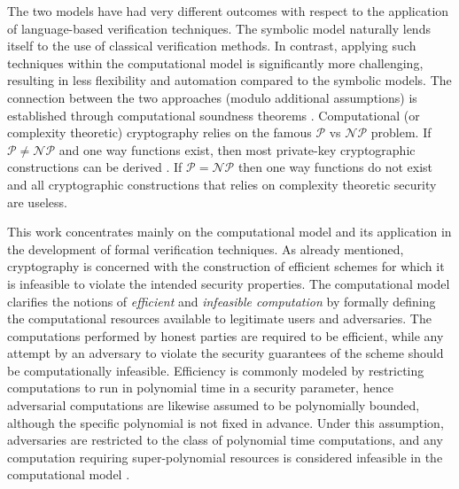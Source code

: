 The two models have had very different outcomes with respect to the application of language-based verification techniques. The symbolic model naturally lends itself to the use of classical verification methods. In contrast, applying such techniques within the computational model is significantly more challenging, resulting in less flexibility and automation compared to the symbolic models. The connection between the two approaches (modulo additional assumptions) is established through computational soundness theorems \cite{reconciling-two-views-of-cryptography}. Computational (or complexity theoretic) cryptography relies on the famous $\mathcal{P}$ vs $\mathcal{NP}$ problem. If $\mathcal{P}\neq\mathcal{NP}$ and one way functions exist, then most private-key cryptographic constructions can be derived \cite{one-way-functions-are-essential-for-complexity-base-cryptography}. If $\mathcal{P}=\mathcal{NP}$ then one way functions do not exist and all cryptographic constructions that relies on complexity theoretic security are useless.

This work concentrates mainly on the computational model and its application in the development of formal verification techniques. As already mentioned, cryptography is concerned with the construction of efficient schemes for which it is infeasible to violate the intended security properties. The computational model clarifies the notions of \textit{efficient} and \textit{infeasible computation} by formally defining the computational resources available to legitimate users and adversaries. The computations performed by honest parties are required to be efficient, while any attempt by an adversary to violate the security guarantees of the scheme should be computationally infeasible. Efficiency is commonly modeled by restricting computations to run in polynomial time in a security parameter, hence adversarial computations are likewise assumed to be polynomially bounded, although the specific polynomial is not fixed in advance. Under this assumption, adversaries are restricted to the class of polynomial time computations, and any computation requiring super-polynomial resources is considered infeasible in the computational model \cite{theory-of-computing}. 

